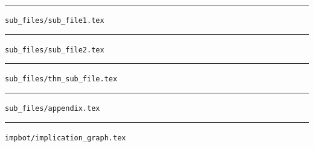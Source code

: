 \documentclass{article}
\newcommand{\fileprefix}{\vspace{20pt}\hrule\vspace{5pt}}
\begin{document}
  \thispagestyle{empty}
  \fileprefix
  \verb|sub_files/sub_file1.tex|
  
  
  \fileprefix
  \verb|sub_files/sub_file2.tex|
  
  
  \fileprefix
  \verb|sub_files/thm_sub_file.tex|
  
  
  \fileprefix
  \verb|sub_files/appendix.tex|
  
  
  \fileprefix
  \verb|impbot/implication_graph.tex|
  \vspace{20pt}
  
\end{document}
